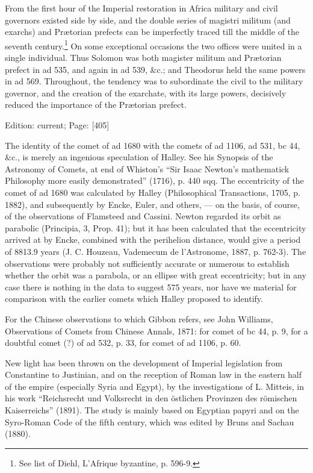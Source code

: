 From the first hour of the Imperial restoration in Africa military and civil governors existed side by side, and the double series of magistri militum (and exarchs) and Prætorian prefects can be imperfectly traced till the middle of the seventh century.\footnote{See list of Diehl, L\texthebrew{}’Afrique byzantine, p. 596-9.} On some exceptional occasions the two offices were united in a single individual. Thus Solomon was both magister militum and Prætorian prefect in ad 535, and again in ad 539, \&c.; and Theodorus held the same powers in ad 569. Throughout, the tendency was to subordinate the civil to the military governor, and the creation of the exarchate, with its large powers, decisively reduced the importance of the Prætorian prefect.

Edition: current; Page: [405]


The identity of the comet of ad 1680 with the comets of ad 1106, ad 531, bc 44, \&c., is merely an ingenious speculation of Halley. See his Synopsis of the Astronomy of Comets, at end of Whiston\texthebrew{}’s \texthebrew{“}Sir Isaac Newton\texthebrew{}’s mathematick Philosophy more easily demonstrated\texthebrew{}” (1716), p. 440 sqq. The eccentricity of the comet of ad 1680 was calculated by Halley (Philosophical Transactions, 1705, p. 1882), and subsequently by Encke, Euler, and others, \texthebrew{—} on the basis, of course, of the observations of Flamsteed and Cassini. Newton regarded its orbit as parabolic (Principia, 3, Prop. 41); but it has been calculated that the eccentricity arrived at by Encke, combined with the perihelion distance, would give a period of 8813.9 years (J. C. Houzeau, Vademecum de l\texthebrew{}’Astronome, 1887, p. 762-3). The observations were probably not sufficiently accurate or numerous to establish whether the orbit was a parabola, or an ellipse with great eccentricity; but in any case there is nothing in the data to suggest 575 years, nor have we material for comparison with the earlier comets which Halley proposed to identify.

For the Chinese observations to which Gibbon refers, see John Williams, Observations of Comets from Chinese Annals, 1871: for comet of bc 44, p. 9, for a doubtful comet (?) of ad 532, p. 33, for comet of ad 1106, p. 60.


New light has been thrown on the development of Imperial legislation from Constantine to Justinian, and on the reception of Roman law in the eastern half of the empire (especially Syria and Egypt), by the investigations of L. Mitteis, in his work \texthebrew{“}Reichsrecht und Volksrecht in den östlichen Provinzen des römischen Kaiserreichs\texthebrew{}” (1891). The study is mainly based on Egyptian papyri and on the Syro-Roman Code of the fifth century, which was edited by Bruns and Sachau (1880).

